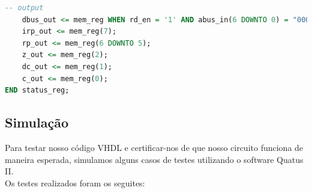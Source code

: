 \documentclass{article}
\begin{document}
\begin{lstlisting}[language=VHDL, caption={Código VHDL status\_reg}]
    -- output
    dbus_out <= mem_reg WHEN rd_en = '1' AND abus_in(6 DOWNTO 0) = "0000011" ELSE "ZZZZZZZZ";
    irp_out <= mem_reg(7);
    rp_out <= mem_reg(6 DOWNTO 5);
    z_out <= mem_reg(2);
    dc_out <= mem_reg(1);
    c_out <= mem_reg(0);
END status_reg;
\end{lstlisting}

\subsection{Simulação}

Para testar nosso código VHDL e certificar-nos de que nosso circuito funciona de maneira esperada, simulamos alguns casos de testes utilizando o software Quatus II.\\

Os testes realizados foram os seguites:
\end{document}

